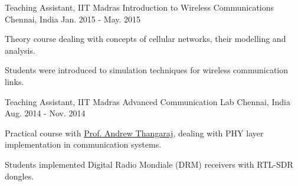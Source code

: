 \begin{cventries}
	\cventry
	{Teaching Assistant, IIT Madras}
	{Introduction to Wireless Communications}
	{Chennai, India}
	{Jan. 2015 - May. 2015}
	{
		\begin{cvitems}
		\item{Theory course dealing with concepts of cellular networks, their modelling and analysis.}
		\item{Students were introduced to simulation techniques for wireless communication links.}
		\end{cvitems}
	}

	\cventry
	{Teaching Assistant, IIT Madras}
	{Advanced Communication Lab}
	{Chennai, India}
	{Aug. 2014 - Nov. 2014}
	{
		\begin{cvitems}
		\item{Practical course with \href{http://www.ee.iitm.ac.in/~andrew/}{Prof. Andrew Thangaraj}, dealing with PHY layer implementation in communication systems.}
		\item{Students implemented Digital Radio Mondiale (DRM) receivers with RTL-SDR dongles.}
		\end{cvitems}
	}

\end{cventries}
